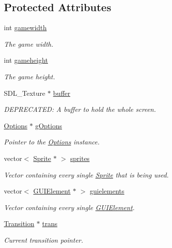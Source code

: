 \subsection*{Protected Attributes}
\begin{DoxyCompactItemize}
\item 
int \hyperlink{class_graphics_adf4a36eb3049ba3d07d79af2b4ac6399}{gamewidth}
\begin{DoxyCompactList}\small\item\em The game width. \end{DoxyCompactList}\item 
int \hyperlink{class_graphics_ac176bce8a1a8b73f6ed05e68410d9a14}{gameheight}
\begin{DoxyCompactList}\small\item\em The game height. \end{DoxyCompactList}\item 
S\-D\-L\-\_\-\-Texture $\ast$ \hyperlink{class_graphics_aa3ea5fd0f0a672850bb1352d5ca302f1}{buffer}
\begin{DoxyCompactList}\small\item\em D\-E\-P\-R\-E\-C\-A\-T\-E\-D\-: A buffer to hold the whole screen. \end{DoxyCompactList}\item 
\hyperlink{class_options}{Options} $\ast$ \hyperlink{class_graphics_aafe6ff08323ccbe6478472e3ec30715c}{g\-Options}
\begin{DoxyCompactList}\small\item\em Pointer to the \hyperlink{class_options}{Options} instance. \end{DoxyCompactList}\item 
vector$<$ \hyperlink{class_sprite}{Sprite} $\ast$ $>$ \hyperlink{class_graphics_ad01e5a24a1ce34c64f6dd7de4f85fc8b}{sprites}
\begin{DoxyCompactList}\small\item\em Vector containing every single \hyperlink{class_sprite}{Sprite} that is being used. \end{DoxyCompactList}\item 
vector$<$ \hyperlink{class_g_u_i_element}{G\-U\-I\-Element} $\ast$ $>$ \hyperlink{class_graphics_ac4ea71ee39d3cbc7b3fc14bf89fa400f}{guielements}
\begin{DoxyCompactList}\small\item\em Vector containing every single \hyperlink{class_g_u_i_element}{G\-U\-I\-Element}. \end{DoxyCompactList}\item 
\hyperlink{class_transition}{Transition} $\ast$ \hyperlink{class_graphics_a0e96d6ad5fd4a2546c2385f92e2ee12d}{trans}
\begin{DoxyCompactList}\small\item\em Current transition pointer. \end{DoxyCompactList}\end{DoxyCompactItemize}


